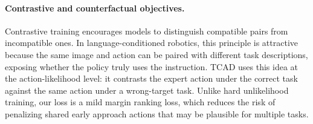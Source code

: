 \paragraph{Contrastive and counterfactual objectives.}
Contrastive training encourages models to distinguish compatible pairs from incompatible ones. In language-conditioned robotics, this principle is attractive because the same image and action can be paired with different task descriptions, exposing whether the policy truly uses the instruction. TCAD uses this idea at the action-likelihood level: it contrasts the expert action under the correct task against the same action under a wrong-target task. Unlike hard unlikelihood training, our loss is a mild margin ranking loss, which reduces the risk of penalizing shared early approach actions that may be plausible for multiple tasks.
